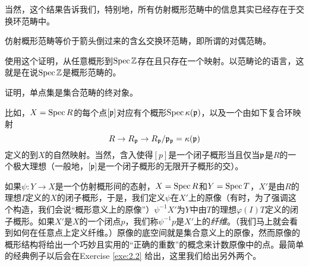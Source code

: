 当然，这个结果告诉我们，特别地，所有仿射概形范畴中的信息其实已经存在于交换环范畴中。

\begin{coro}\label{coro:1.41}
	仿射概形范畴等价于箭头倒过来的含幺交换环范畴，即所谓的对偶范畴。
\end{coro}

\begin{exe}\label{exe:1.42}
	\begin{compactenum}[(a)]
	\item 使用这个证明，从任意概形到$\operatorname{Spec} \mathbb{Z}$存在且只存在一个映射。以范畴论的语言，这就是在说$\operatorname{Spec} \mathbb{Z}$是概形范畴的。
	\item 证明，单点集是集合范畴的终对象。
	\end{compactenum}
\end{exe}

比如，$X=\operatorname{Spec} R$的每个点$[\mathfrak{p}]$对应有个概形$\operatorname{Spec} \kappa(\mathfrak{p})$，以及一个由如下复合环映射
\[
	R\to R_{\mathfrak{p}}\to R_{\mathfrak{p}}/\mathfrak{p}_{\mathfrak{p}}=\kappa(\mathfrak{p})
\]
定义的到$X$的自然映射。当然，含入使得$[p]$是一个闭子概形当且仅当$\mathfrak{p}$是$R$的一个极大理想（一般地，$[\mathfrak{p}]$是一个闭子概形的无限开子概形的交）。

如果$\psi:Y\to X$是一个仿射概形间的态射，$X=\operatorname{Spec} R$和$Y=\operatorname{Spec} T$，$X'$是由$R$的理想$I$定义的$X$的闭子概形，于是，我们定义$\psi$在$X'$上的原像（有时，为了强调这个构造，我们会说“概形意义上的原像”）$\psi^{-1}X'$为$Y$中由$T$的理想$\varphi(I)T$定义的闭子概形。如果$X'$是$X$的一个闭点$p$，我们称$\psi^{-1}p$是$X'$上的\textit{纤维}。（我们马上就会看到如何在任意点上定义纤维。）原像的底空间就是集合意义上的原像，然而原像的概形结构将给出一个巧妙且实用的“正确的重数”的概念来计数原像中的点。最简单的经典例子以后会在Exercise \ref{exe:2.2} 给出，这里我们给出另外两个。

